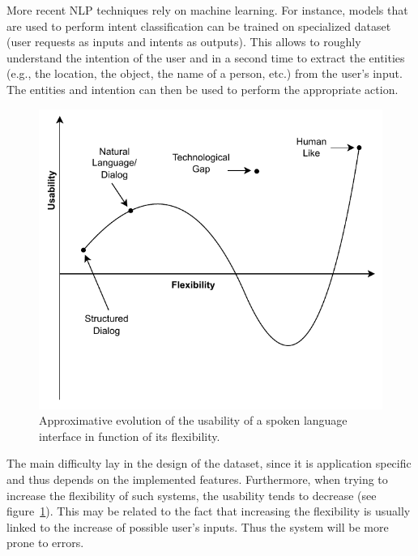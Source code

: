 \documentclass[sigconf]{acmart}
\begin{document}
More recent NLP techniques rely on machine learning. For instance, models that are used to perform intent classification can be trained on specialized dataset (user requests as inputs and intents as outputs). This allows to roughly understand the intention of the user and in a second time to extract the entities (e.g., the location, the object, the name of a person, etc.) from the user's input. The entities and intention can then be used to perform the appropriate action.

\begin{figure}[ht]
  \centering
  \includegraphics[width=0.7\linewidth]{figures/schematics-canny_interactive_agent.drawio}
  \caption{Approximative evolution of the usability of a spoken language interface in function of its flexibility\cite{mooreCannyApproachSpoken2019}.\label{fig:usability}}
\end{figure}

The main difficulty lay in the design of the dataset, since it is application specific and thus depends on the implemented features. Furthermore, when trying to increase the flexibility of such systems, the usability tends to decrease (see figure~\ref{fig:usability}). This may be related to the fact that increasing the flexibility is usually linked to the increase of possible user's inputs. Thus the system will be more prone to errors.
\end{document}

